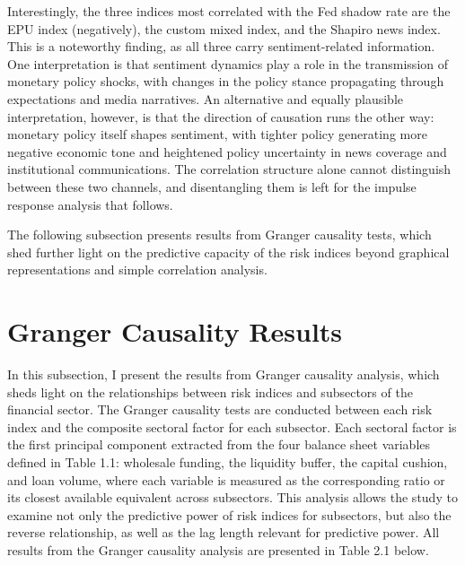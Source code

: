 \documentclass[12pt,a4paper]{report}\usepackage[a4paper, top=2.5cm, bottom=2.5cm, left=2.5cm, right=2.5cm]{geometry}
\begin{document}
Interestingly, the three indices most correlated with the Fed shadow rate are the EPU index (negatively), the custom mixed index, and the Shapiro news index. This is a noteworthy finding, as all three carry sentiment-related information. One interpretation is that sentiment dynamics play a role in the transmission of monetary policy shocks, with changes in the policy stance propagating through expectations and media narratives. An alternative and equally plausible interpretation, however, is that the direction of causation runs the other way: monetary policy itself shapes sentiment, with tighter policy generating more negative economic tone and heightened policy uncertainty in news coverage and institutional communications. The correlation structure alone cannot distinguish between these two channels, and disentangling them is left for the impulse response analysis that follows.

The following subsection presents results from Granger causality tests, which shed further light on the predictive capacity of the risk indices beyond graphical representations and simple correlation analysis.

\section{Granger Causality Results}
In this subsection, I present the results from Granger causality analysis, which sheds light on the relationships between risk indices and subsectors of the financial sector. The Granger causality tests are conducted between each risk index and the composite sectoral factor for each subsector. Each sectoral factor is the first principal component extracted from the four balance sheet variables defined in Table 1.1: wholesale funding, the liquidity buffer, the capital cushion, and loan volume, where each variable is measured as the corresponding ratio or its closest available equivalent across subsectors. This analysis allows the study to examine not only the predictive power of risk indices for subsectors, but also the reverse relationship, as well as the lag length relevant for predictive power. All results from the Granger causality analysis are presented in Table 2.1 below.
\end{document}
